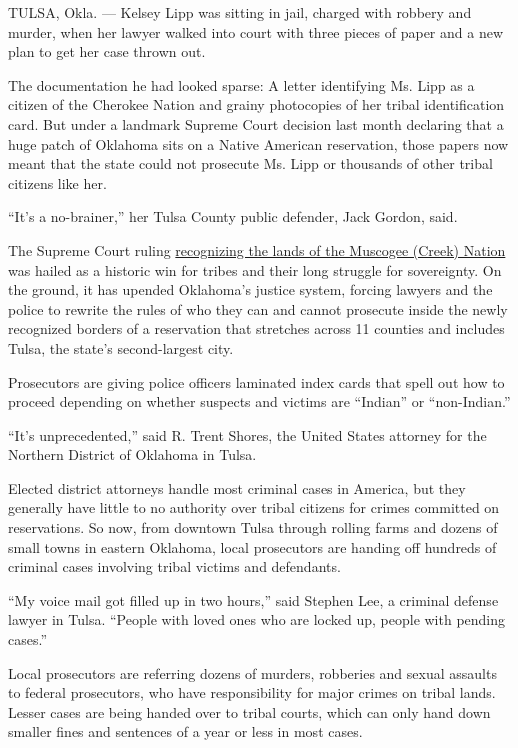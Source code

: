 TULSA, Okla. --- Kelsey Lipp was sitting in jail, charged with robbery
and murder, when her lawyer walked into court with three pieces of paper
and a new plan to get her case thrown out.

The documentation he had looked sparse: A letter identifying Ms. Lipp as
a citizen of the Cherokee Nation and grainy photocopies of her tribal
identification card. But under a landmark Supreme Court decision last
month declaring that a huge patch of Oklahoma sits on a Native American
reservation, those papers now meant that the state could not prosecute
Ms. Lipp or thousands of other tribal citizens like her.

``It's a no-brainer,'' her Tulsa County public defender, Jack Gordon,
said.

The Supreme Court ruling
\href{https://www.nytimes3xbfgragh.onion/2020/07/09/us/supreme-court-oklahoma-mcgirt-creek-nation.html}{recognizing
the lands of the Muscogee (Creek) Nation} was hailed as a historic win
for tribes and their long struggle for sovereignty. On the ground, it
has upended Oklahoma's justice system, forcing lawyers and the police to
rewrite the rules of who they can and cannot prosecute inside the newly
recognized borders of a reservation that stretches across 11 counties
and includes Tulsa, the state's second-largest city.

Prosecutors are giving police officers laminated index cards that spell
out how to proceed depending on whether suspects and victims are
``Indian'' or ``non-Indian.''

``It's unprecedented,'' said R. Trent Shores, the United States attorney
for the Northern District of Oklahoma in Tulsa.

Elected district attorneys handle most criminal cases in America, but
they generally have little to no authority over tribal citizens for
crimes committed on reservations. So now, from downtown Tulsa through
rolling farms and dozens of small towns in eastern Oklahoma, local
prosecutors are handing off hundreds of criminal cases involving tribal
victims and defendants.

``My voice mail got filled up in two hours,'' said Stephen Lee, a
criminal defense lawyer in Tulsa. ``People with loved ones who are
locked up, people with pending cases.''

Local prosecutors are referring dozens of murders, robberies and sexual
assaults to federal prosecutors, who have responsibility for major
crimes on tribal lands. Lesser cases are being handed over to tribal
courts, which can only hand down smaller fines and sentences of a year
or less in most cases.

